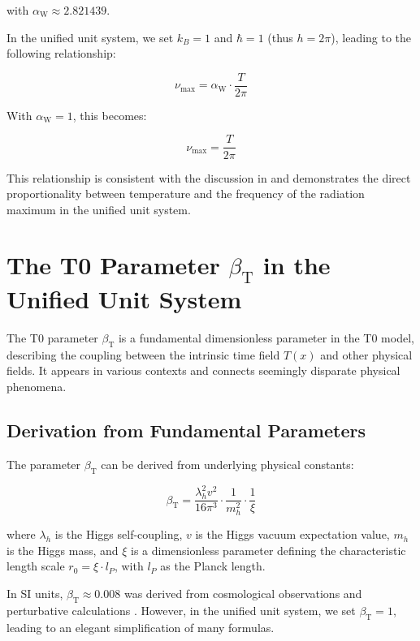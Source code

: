 \documentclass[12pt,a4paper]{article}
\newcommand{\Tfield}{T(x)}
\newcommand{\betaT}{\beta_{\text{T}}}
\newcommand{\alphaW}{\alpha_{\text{W}}}
\begin{document}
	with \(\alphaW \approx 2.821439\).
	
	In the unified unit system, we set \(k_B = 1\) and \(\hbar = 1\) (thus \(h = 2\pi\)), leading to the following relationship:
	
	\begin{equation}
		\nu_{\text{max}} = \alphaW \cdot \frac{T}{2\pi}
	\end{equation}
	
	With \(\alphaW = 1\), this becomes:
	
	\begin{equation}
		\nu_{\text{max}} = \frac{T}{2\pi}
	\end{equation}
	
	This relationship is consistent with the discussion in \cite{pascher_temp_2025} and demonstrates the direct proportionality between temperature and the frequency of the radiation maximum in the unified unit system.
	
	\section{The T0 Parameter \(\betaT\) in the Unified Unit System}
	
	The T0 parameter \(\betaT\) is a fundamental dimensionless parameter in the T0 model, describing the coupling between the intrinsic time field \(\Tfield\) and other physical fields. It appears in various contexts and connects seemingly disparate physical phenomena.
	
	\subsection{Derivation from Fundamental Parameters}
	
	The parameter \(\betaT\) can be derived from underlying physical constants:
	
	\begin{equation}
		\betaT = \frac{\lambda_h^2 v^2}{16\pi^3} \cdot \frac{1}{m_h^2} \cdot \frac{1}{\xi}
	\end{equation}
	
	where \(\lambda_h\) is the Higgs self-coupling, \(v\) is the Higgs vacuum expectation value, \(m_h\) is the Higgs mass, and \(\xi\) is a dimensionless parameter defining the characteristic length scale \(r_0 = \xi \cdot l_P\), with \(l_P\) as the Planck length.
	
	In SI units, \(\betaT \approx 0.008\) was derived from cosmological observations and perturbative calculations \cite{pascher_params_2025}. However, in the unified unit system, we set \(\betaT = 1\), leading to an elegant simplification of many formulas.
	
\end{document}
